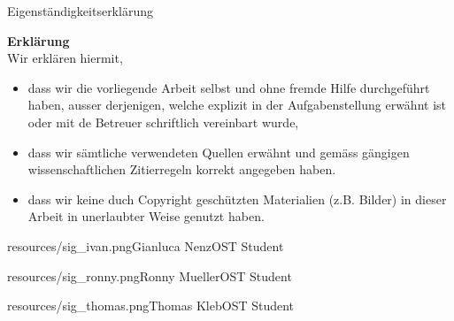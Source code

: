 Eigenständigkeitserklärung

\vspace{2 cm}

\noindent \textbf{Erklärung} \\
Wir erklären hiermit, \\

\begin{itemize}
    \item dass wir die vorliegende Arbeit selbst und ohne fremde Hilfe durchgeführt haben, ausser derjenigen, welche explizit in der Aufgabenstellung erwähnt ist oder mit de Betreuer schriftlich vereinbart wurde,
    \item dass wir sämtliche verwendeten Quellen erwähnt und gemäss gängigen wissen\-schaftlichen Zitierregeln korrekt angegeben haben.
    \item dass wir keine duch Copyright geschützten Materialien (z.B. Bilder) in dieser Arbeit in unerlaubter Weise genutzt haben.
\end{itemize}

\signature{0.75}{resources/sig_ivan.png}{Gianluca Nenz}{OST Student}\hfill\signature{2}{resources/sig_ronny.png}{Ronny Mueller}{OST Student}

\signature{0.2}{resources/sig_thomas.png}{Thomas Kleb}{OST Student}

